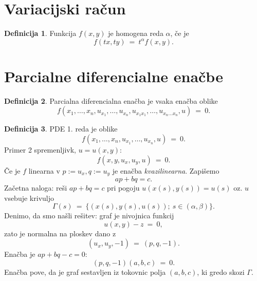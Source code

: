 \documentclass[11pt]{article}
\newcommand{\set}[1]{\{#1\}}
\newcommand{\0}{\mathbf{0}}
\theoremstyle{definition}
\newtheorem{definicija}{Definicija}[section]
\theoremstyle{definition}
\theoremstyle{definition}
\theoremstyle{definition}
\begin{document}
\pagebreak


\section{Variacijski račun}
\vspace{0.5cm}

\begin{definicija}

Funkcija $f(x,y)$ je homogena reda $\alpha$, če je
$$f(tx,ty) ~=~ t^\alpha f(x,y).$$
 
\end{definicija}
\vspace{0.5cm}

\pagebreak


\section{Parcialne diferencialne enačbe}
\vspace{0.5cm}

\begin{definicija}

Parcialna diferencialna enačba je vsaka enačba oblike
$$f(x_1,\ldots,x_n, u_{x_1},\ldots,u_{x_n},u_{x_1x_1},\ldots,u_{x_n\ldots x_n},u) ~=~ 0.$$

\end{definicija}
\vspace{0.5cm}

\begin{definicija}

PDE 1. reda je oblike
$$f(x_1,\ldots,x_n,u_{x_1},\ldots,u_{x_n},u) ~=~ 0.$$
Primer 2 spremenljivk, $u=u(x,y)$:
$$f(x,y,u_x,u_y,u) ~=~ 0.$$
Če je $f$ linearna v $p:=u_x, q:=u_y$ je enačba \textit{kvazilinearna}. Zapišemo
$$ap + bq = c.$$ Začetna naloga: reši $ap+bq=c$ pri pogoju $u(x(s),y(s))=u(s)$ oz. $u$ vsebuje krivuljo
$$\Gamma(s) ~=~ \set{(x(s),y(s),u(s)); ~s \in (\alpha,\beta)}.$$
Denimo, da smo našli rešitev: graf je nivojnica funkcij
$$u(x,y)-z ~=~ 0,$$
zato je normalna na ploskev dano z
$$(u_x,u_y,-1) ~=~ (p,q,-1).$$
Enačba je $ap+bq-c=0$:
$$(p,q,-1)(a,b,c) ~=~ 0.$$
Enačba pove, da je graf sestavljen iz tokovnic polja $(a,b,c)$, ki gredo skozi $\Gamma$.

\end{definicija}
\vspace{0.5cm}
\end{document}

